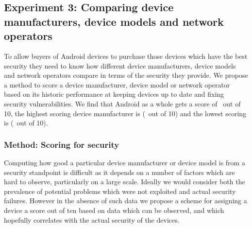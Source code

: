 \subsection{Experiment 3: Comparing device manufacturers, device models and network operators}
\label{sec:security_scoring}\label{sec:exp:security_score}

To allow buyers of Android devices to purchase those devices which have the best security they need to know how different device manufacturers, device models and network operators compare in terms of the security they provide.
We propose a method to score a device manufacturer, device model or network operator based on its historic performance at keeping devices up to date and fixing security vulnerabilities.
We find that Android as a whole gets a score of \daSecurityScore\ out of 10, the highest scoring device manufacturer is \emph{\daSecScoreBestmanufacturer} (\daSecScoreBestmanufacturerScore\ out of 10) and the lowest scoring is \emph{\daSecScoreWorstmanufacturer} (\daSecScoreWorstmanufacturerScore\ out of 10).

\subsubsection{Method: Scoring for security}

Computing how good a particular device manufacturer or device model is from a security standpoint is difficult as it depends on a number of factors which are hard to observe, particularly on a large scale.
Ideally we would consider both the prevalence of potential problems which were not exploited and actual security failures.
However in the absence of such data we propose a scheme for assigning a device a score out of ten based on data which can be observed, and which hopefully correlates with the actual security of the devices.

